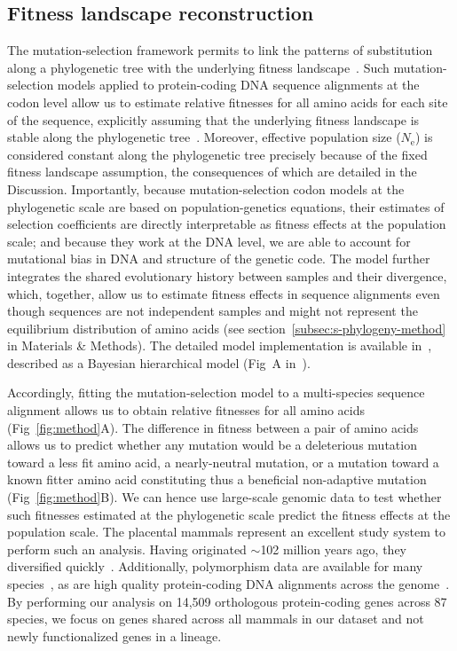 \documentclass[10pt,letterpaper]{article}
\newcommand{\Ne}{N_{\text{e}}}
\begin{document}
\subsection*{Fitness landscape reconstruction}

The mutation-selection framework permits to link the patterns of substitution along a phylogenetic tree with the underlying fitness landscape~\cite{halpern_evolutionary_1998, mccandlish_modeling_2014}.
Such mutation-selection models applied to protein-coding DNA sequence alignments at the codon level allow us to estimate relative fitnesses for all amino acids for each site of the sequence, explicitly assuming that the underlying fitness landscape is stable along the phylogenetic tree~\cite{rodrigue_mechanistic_2010, tamuri_estimating_2012, rodrigue_detecting_2017}.
Moreover, effective population size ($\Ne$) is considered constant along the phylogenetic tree precisely because of the fixed fitness landscape assumption, the consequences of which are detailed in the Discussion.
Importantly, because mutation-selection codon models at the phylogenetic scale are based on population-genetics equations, their estimates of selection coefficients are directly interpretable as fitness effects at the population scale; and because they work at the DNA level, we are able to account for mutational bias in DNA and structure of the genetic code.
The model further integrates the shared evolutionary history between samples and their divergence, which, together, allow us to estimate fitness effects in sequence alignments even though sequences are not independent samples and might not represent the equilibrium distribution of amino acids (see section~\ref{subsec:s-phylogeny-method} in Materials \& Methods).
The detailed model implementation is available in~, described as a Bayesian hierarchical model (Fig~A in~).

Accordingly, fitting the mutation-selection model to a multi-species sequence alignment allows us to obtain relative fitnesses for all amino acids (Fig~\ref{fig:method}A).
The difference in fitness between a pair of amino acids allows us to predict whether any mutation would be a deleterious mutation toward a less fit amino acid, a nearly-neutral mutation, or a mutation toward a known fitter amino acid constituting thus a beneficial non-adaptive mutation (Fig~\ref{fig:method}B).
We can hence use large-scale genomic data to test whether such fitnesses estimated at the phylogenetic scale predict the fitness effects at the population scale.
The placental mammals represent an excellent study system to perform such an analysis.
Having originated $\sim$102 million years ago, they diversified quickly~\cite{foley_genomic_2023}.
Additionally, polymorphism data are available for many species~\cite{howe_ensembl_2021}, as are high quality protein-coding DNA alignments across the genome~\cite{ranwez_orthomam_2007, scornavacca_orthomam_2019}.
By performing our analysis on 14,509 orthologous protein-coding genes across 87 species, we focus on genes shared across all mammals in our dataset and not newly functionalized genes in a lineage.
\end{document}
